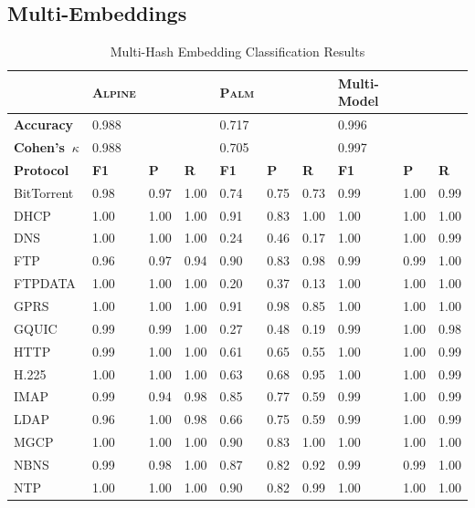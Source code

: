 \subsection{Multi-Embeddings}

\begin{table}
\caption{Multi-Hash Embedding Classification Results}
\centering
\begin{tabular}{| p{2cm} | p{0.6cm} p{0.6cm} p{0.6cm} || p{0.6cm} p{0.6cm} p{0.6cm} || p{0.6cm} p{0.6cm} p{0.6cm}|}
\hline
& \textbf{\textsc{Alpine}} & & & \textbf{\textsc{Palm}} & & & \textbf{Multi-Model} & & \\
\hline
\hline
\textbf{Accuracy} & 0.988 & & & 0.717 & & & 0.996 & & \\
\textbf{Cohen's~$\kappa$} & 0.988 & & & 0.705 & & & 0.997 & & \\
\hline
\hline
 \textbf{Protocol} & \textbf{F1} & \textbf{P} & \textbf{R} & \textbf{F1} & \textbf{P} & \textbf{R} & \textbf{F1} & \textbf{P} & \textbf{R} \\
 \hline
 BitTorrent & 0.98 & 0.97 & 1.00 & 0.74 & 0.75 & 0.73 & 0.99 & 1.00 & 0.99 \\
 DHCP & 1.00 & 1.00 & 1.00 & 0.91 & 0.83 & 1.00 & 1.00 & 1.00 & 1.00 \\
 DNS & 1.00 & 1.00 & 1.00 & 0.24 & 0.46 & 0.17 & 1.00 & 1.00 & 0.99 \\
 FTP & 0.96 & 0.97 &  0.94 & 0.90 & 0.83 & 0.98 & 0.99 & 0.99 & 1.00 \\
 FTPDATA & 1.00 & 1.00 & 1.00 & 0.20 & 0.37 & 0.13 & 1.00 & 1.00 & 1.00 \\
 GPRS & 1.00 & 1.00 & 1.00 & 0.91 & 0.98 & 0.85 & 1.00 & 1.00 & 1.00 \\
 GQUIC & 0.99 & 0.99 & 1.00 & 0.27 & 0.48 & 0.19 & 0.99 & 1.00 & 0.98 \\
 HTTP & 0.99 & 1.00 & 1.00 & 0.61 & 0.65 & 0.55 & 1.00 & 1.00 & 0.99 \\
 H.225 & 1.00 & 1.00 & 1.00 & 0.63 & 0.68 & 0.95 & 1.00 & 1.00 & 0.99 \\
 IMAP & 0.99 & 0.94 & 0.98 & 0.85 & 0.77 & 0.59 & 0.99 & 1.00 & 0.99 \\
 LDAP & 0.96 & 1.00 & 0.98 & 0.66 & 0.75 & 0.59 & 0.99 & 1.00 & 0.99 \\
 MGCP & 1.00 & 1.00 & 1.00 & 0.90 & 0.83 & 1.00 & 1.00 & 1.00 & 1.00 \\
 NBNS & 0.99 & 0.98 & 1.00 & 0.87 & 0.82 & 0.92 & 0.99 & 0.99 & 1.00 \\
 NTP & 1.00 & 1.00 & 1.00 & 0.90 & 0.82 & 0.99 & 1.00 & 1.00 & 1.00 \\

\end{tabular}
\end{table}
